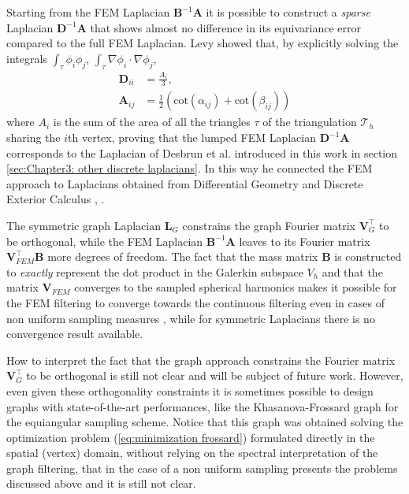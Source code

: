 Starting from the FEM Laplacian $\mathbf B^{-1}\mathbf A$ it is possible to construct a \textit{sparse} Laplacian $\mathbf D^{-1}\mathbf A$ that shows almost no difference in its equivariance error compared to the full FEM Laplacian. Levy \cite{levy} showed that, by explicitly solving the integrals $\int_\tau \phi_i \phi_j$, $\int_\tau \nabla \phi_i \cdot \nabla \phi_j$, 
$$\begin{aligned}
\mathbf D_{ii} &= \frac{A_i}{3},\\
\mathbf A_{ij} &= \frac{1}{2}\left(\text{cot}(\alpha_{ij}) + \text{cot}(\beta_{ij})\right)
\end{aligned}$$
where $A_i$ is the sum of the area of all the triangles $\tau$ of the triangulation $\mathcal T_h$ sharing the $i$th vertex, proving that the lumped FEM Laplacian $\mathbf D^{-1}\mathbf A$ corresponds to the Laplacian of Desbrun et al. \cite{Desbrun1999} introduced in this work in section \ref{sec:Chapter3: other discrete laplacians}. In this way he connected the FEM approach to Laplacians obtained from Differential Geometry and Discrete Exterior Calculus \cite{vallet}, \cite{meyer}.

\begin{snugshade*}
	The  symmetric  graph Laplacian $\mathbf L_G$ constrains the graph Fourier matrix $\mathbf V_G^\intercal$ to be orthogonal, while the FEM Laplacian $\mathbf B^{-1}\mathbf A$ leaves to its Fourier matrix $\mathbf V_{FEM}^\intercal\mathbf B$ more degrees of freedom. The fact that the mass matrix $\mathbf B$ is constructed to \textit{exactly} represent the dot product in the Galerkin subspace $V_h$ and that the matrix $\mathbf V_{FEM}$ converges to the sampled spherical harmonics makes it possible for the FEM filtering to converge towards the continuous filtering even in cases of non uniform sampling measures \cite{Quarteroni:1639539}, while for symmetric Laplacians there is no convergence result available.
\end{snugshade*}

How to interpret the fact that the graph approach constrains the Fourier matrix $\mathbf V_G^\intercal$ to be orthogonal is still not clear and will be subject of future work. However, even given these orthogonality constraints it is sometimes possible to design graphs with state-of-the-art performances, like the Khasanova-Frossard graph for the equiangular sampling scheme. Notice that this graph was obtained solving the optimization problem (\ref{eq:minimization frossard}) formulated directly in the spatial (vertex) domain, without relying on the spectral interpretation of the graph filtering, that in the case of a non uniform sampling presents the problems discussed above and it is still not clear.

